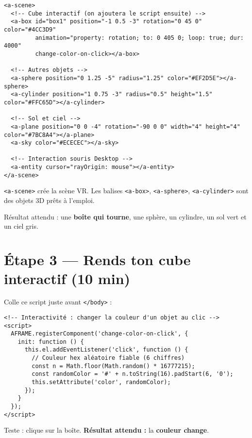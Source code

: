 \documentclass[12pt]{article}
\begin{document}
\begin{verbatim}
<a-scene>
  <!-- Cube interactif (on ajoutera le script ensuite) -->
  <a-box id="box1" position="-1 0.5 -3" rotation="0 45 0" color="#4CC3D9"
         animation="property: rotation; to: 0 405 0; loop: true; dur: 4000"
         change-color-on-click></a-box>

  <!-- Autres objets -->
  <a-sphere position="0 1.25 -5" radius="1.25" color="#EF2D5E"></a-sphere>
  <a-cylinder position="1 0.75 -3" radius="0.5" height="1.5" color="#FFC65D"></a-cylinder>

  <!-- Sol et ciel -->
  <a-plane position="0 0 -4" rotation="-90 0 0" width="4" height="4" color="#7BC8A4"></a-plane>
  <a-sky color="#ECECEC"></a-sky>

  <!-- Interaction souris Desktop -->
  <a-entity cursor="rayOrigin: mouse"></a-entity>
</a-scene>
\end{verbatim}

\begin{tip}
\texttt{<a-scene>} crée la scène VR. Les balises \texttt{<a-box>}, \texttt{<a-sphere>}, \texttt{<a-cylinder>} sont des objets 3D prêts à l'emploi.
\end{tip}

\begin{checkpoint}
Résultat attendu : une \textbf{boîte qui tourne}, une sphère, un cylindre, un sol vert et un ciel gris.
\end{checkpoint}

\section{Étape 3 — Rends ton cube interactif (10 min)}
Colle ce script juste avant \texttt{</body>} :

\begin{verbatim}
<!-- Interactivité : changer la couleur d'un objet au clic -->
<script>
  AFRAME.registerComponent('change-color-on-click', {
    init: function () {
      this.el.addEventListener('click', function () {
        // Couleur hex aléatoire fiable (6 chiffres)
        const n = Math.floor(Math.random() * 16777215);
        const randomColor = '#' + n.toString(16).padStart(6, '0');
        this.setAttribute('color', randomColor);
      });
    }
  });
</script>
\end{verbatim}

\begin{checkpoint}
Teste : clique sur la boîte. \textbf{Résultat attendu :} la \textbf{couleur change}.
\end{checkpoint}
\end{document}
